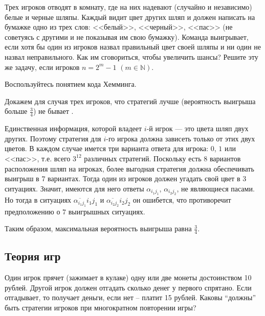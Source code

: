 \begin{problem}

Трех игроков отводят в комнату, где на них надевают (случайно и независимо) белые и черные шляпы. Каждый видит 
цвет других шляп и должен написать на бумажке одно из трех слов: <<белый>>, <<черный>>, <<пас>> 
(не советуясь с другими и не показывая им свою бумажку). Команда выигрывает, если хотя бы один из игроков назвал правильный 
цвет своей шляпы и ни один не назвал неправильного. Как им сговориться, чтобы увеличить шансы? 
Решите эту же задачу, если игроков $n=2^m -1$ $( m\in {\mathbb N} )$. 
\end{problem}

\begin{ordre}
Воспользуйтесь понятием кода Хемминга.
\end{ordre}

\begin{remark}
Докажем для случая трех игроков, что стратегий лучше (вероятность выигрыша больше  $ \frac{3}{4}$) не бывает . 

Единственная информация, которой владеет $i$-й игрок --- это цвета шляп двух других. Поэтому стратегия для $i$-го игрока должна зависеть 
только от этих двух цветов. В каждом случае имется три варианта ответа для игрока: $0$, $1$ или <<пас>>, т.е. всего $3^{12}$ различных 
стратегий. Поскольку есть $8$ вариантов расположения шляп на игроках, более выгодная стратегия должна обеспечивать выигрыш в $7$ вариантах. 
Тогда один из игроков должен угадать свой цвет в $3$ ситуациях. Значит, имеются для него ответы $\alpha_{i_1 j_1}$, 
$\alpha_{i_2 j_2}$, не являющиеся пасами. Но тогда в ситуациях $\overline{\alpha_{i_1 j_1}} i_1 j_1$ и 
$\overline{\alpha_{i_2 j_2}} i_2 j_2$ он ошибется, что противоречит предположению о $7$ выигрышных ситуациях. 

Таким образом, максимальная вероятность выигрыша равна $\frac{3}{4}$. 

\end{remark}



\subsection{Теория игр}
\begin{problem}
Один игрок прячет (зажимает в кулаке) одну или две монеты достоинством 10 рублей. Другой игрок должен отгадать сколько денег у первого спрятано. Если отгадывает, то получает деньги, если нет -- платит 15 рублей. Каковы ``должны'' быть стратегии игроков при многократном повторении игры?

\end{problem}

